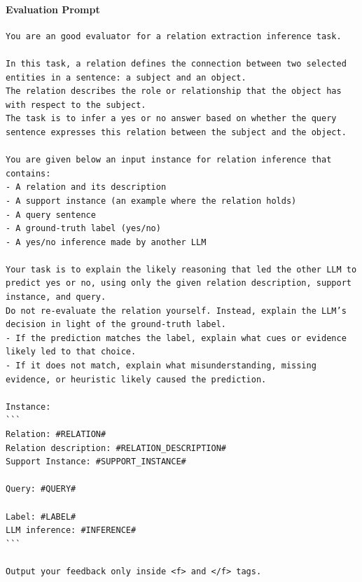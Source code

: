 \documentclass[12pt]{article}
\begin{document}
\paragraph{Evaluation Prompt}
\begin{verbatim} 
You are an good evaluator for a relation extraction inference task.

In this task, a relation defines the connection between two selected entities in a sentence: a subject and an object.
The relation describes the role or relationship that the object has with respect to the subject.
The task is to infer a yes or no answer based on whether the query sentence expresses this relation between the subject and the object.

You are given below an input instance for relation inference that contains:
- A relation and its description
- A support instance (an example where the relation holds)
- A query sentence
- A ground-truth label (yes/no)
- A yes/no inference made by another LLM

Your task is to explain the likely reasoning that led the other LLM to predict yes or no, using only the given relation description, support instance, and query. 
Do not re-evaluate the relation yourself. Instead, explain the LLM’s decision in light of the ground-truth label.
- If the prediction matches the label, explain what cues or evidence likely led to that choice.
- If it does not match, explain what misunderstanding, missing evidence, or heuristic likely caused the prediction.

Instance:
```
Relation: #RELATION#
Relation description: #RELATION_DESCRIPTION#
Support Instance: #SUPPORT_INSTANCE#

Query: #QUERY#

Label: #LABEL#
LLM inference: #INFERENCE#
```

Output your feedback only inside <f> and </f> tags.
\end{verbatim}

\pagebreak
\end{document}
